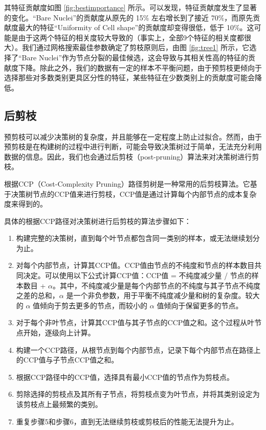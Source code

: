 \documentclass[a4paper,12pt,onecolumn,oneside]{article}
\begin{document}
	其特征贡献度如图 \ref{fig:bestimportance} 所示。可以发现，特征贡献度发生了显著的变化。“Bare Nuclei”的贡献度从原先的 15\% 左右增长到了接近 70\%，而原先贡献度最大的特征“Uniformity of Cell shape”的贡献度却变得很低，低于 10\%。这可能是由于这两个特征的相关度较大导致的（事实上，全部9个特征的相关度都很大）。我们通过网格搜索最佳参数确定了剪枝原则后，由图 \ref{fig:tree1} 所示，它选择了“Bare Nuclei”作为节点分裂的最佳候选，这会导致与其相关性高的特征的贡献度下降。除此之外，我们的数据有一定的样本不平衡问题，由于预剪枝更倾向于选择那些对多数类别更具区分性的特征，某些特征在少数类别上的贡献度可能会降低。
	
\subsection{后剪枝}\label{houjianzhi}
	预剪枝可以减少决策树的复杂度，并且能够在一定程度上防止过拟合。然而，由于预剪枝是在构建树的过程中进行判断，可能会导致决策树过于简单，无法充分利用数据的信息。因此，我们也会通过后剪枝（post-pruning）算法来对决策树进行剪枝。
	
	根据CCP（Cost-Complexity Pruning）路径剪树是一种常用的后剪枝算法。它基于决策树节点的CCP值来进行剪枝，CCP值是通过计算每个内部节点的成本复杂度来得到的。
	
	具体的根据CCP路径对决策树进行后剪枝的算法步骤如下：
	
	\begin{enumerate}
		\item 构建完整的决策树，直到每个叶节点都包含同一类别的样本，或无法继续划分为止。
		\item 对每个内部节点，计算其CCP值。CCP值由节点的不纯度和节点的样本数目共同决定。可以使用以下公式计算CCP值：CCP值 = 不纯度减少量 / 节点的样本数目 + $\alpha$。其中，不纯度减少量是每个内部节点的不纯度与其子节点不纯度之差的总和，$\alpha$ 是一个非负参数，用于平衡不纯度减少量和树的复杂度。较大的 $\alpha$ 值倾向于剪去更多的节点，而较小的 $\alpha$ 值倾向于保留更多的节点。
		\item 对于每个非叶节点，计算其CCP值与其子节点的CCP值之和。这个过程从叶节点开始，逐级向上计算。
		\item 构建一个CCP路径，从根节点到每个内部节点，记录下每个内部节点在路径上的CCP值与子节点CCP值之和。
		\item 根据CCP路径中的CCP值，选择具有最小CCP值的节点作为剪枝点。
		\item 剪除选择的剪枝点及其所有子节点，将剪枝点变为叶节点，并将其类别设定为该剪枝点上最频繁的类别。
		\item 重复步骤5和步骤6，直到无法继续剪枝或剪枝后的性能无法提升为止。
	\end{enumerate}
	
\end{document}
